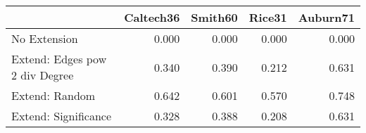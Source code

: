 \begin{tabular}{lrrrr}
\toprule
{} & Caltech36 & Smith60 & Rice31 & Auburn71 \\
\midrule
No Extension                   &     0.000 &   0.000 &  0.000 &    0.000 \\
Extend: Edges pow 2 div Degree &     0.340 &   0.390 &  0.212 &    0.631 \\
Extend: Random                 &     0.642 &   0.601 &  0.570 &    0.748 \\
Extend: Significance           &     0.328 &   0.388 &  0.208 &    0.631 \\
\bottomrule
\end{tabular}
